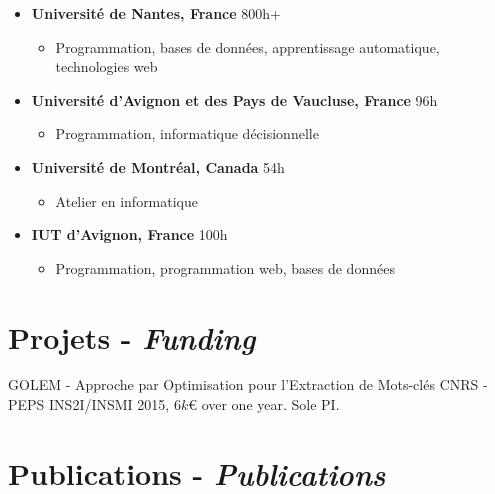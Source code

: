 \documentclass[11pt,a4paper]{moderncv}
\begin{document}
\begin{itemize}[leftmargin=0.5cm,itemsep=-0.2cm]
    \item \textbf{Université de Nantes, France} \hfill 800h+
    \vspace*{-0.3cm}
    \begin{itemize}
        \item Programmation, bases de données, apprentissage automatique, 
              technologies web
    \end{itemize}
    \item \textbf{Université d'Avignon et des Pays de Vaucluse, France} \hfill 96h
    \vspace*{-0.3cm}
    \begin{itemize}
        \item Programmation, informatique décisionnelle 
    \end{itemize}
    \item \textbf{Université de Montréal, Canada} \hfill 54h
    \vspace*{-0.3cm}
    \begin{itemize}
        \item Atelier en informatique
    \end{itemize}
    \item \textbf{IUT d'Avignon, France} \hfill 100h
    \vspace*{-0.3cm}
    \begin{itemize}
        \item Programmation, programmation web, bases de données
    \end{itemize}
\end{itemize}

\section{Projets - \textit{Funding}}

        {GOLEM - Approche par Optimisation pour l'Extraction de Mots-clés}
        {}
        {}{}
        {CNRS - PEPS INS2I/INSMI 2015, 6$k$\euro{} over one year. Sole PI.}

\section{Publications - \textit{Publications}}
\end{document}
